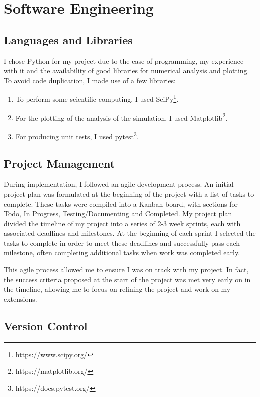 \documentclass[12pt,a4paper,twoside,openright]{report}
\begin{document}
\section{Software Engineering}\label{section:software}

\subsection{Languages and Libraries}

I chose Python for my project due to the ease of programming, my experience with it and the availability of good libraries for numerical analysis and plotting. To avoid code duplication, I made use of a few libraries:

\begin{enumerate}
 	\item To perform some scientific computing, I used SciPy\footnote{https://www.scipy.org/}.
	\item For the plotting of the analysis of the simulation, I used Matplotlib\footnote{https://matplotlib.org/}. 
	\item For producing unit tests, I used pytest\footnote{https://docs.pytest.org/}.
\end{enumerate}

\subsection{Project Management}

During implementation, I followed an agile development process. An initial project plan was formulated at the beginning of the project with a list of tasks to complete. These tasks were compiled into a Kanban board, with sections for Todo, In Progress, Testing/Documenting and Completed. My project plan divided the timeline of my project into a series of 2-3 week sprints, each with associated deadlines and milestones. At the beginning of each sprint I selected the tasks to complete in order to meet these deadlines and successfully pass each milestone, often completing additional tasks when work was completed early.

This agile process allowed me to ensure I was on track with my project. In fact, the success criteria proposed at the start of the project was met very early on in the timeline, allowing me to focus on refining the project and work on my extensions. 

\subsection{Version Control}
\end{document}
